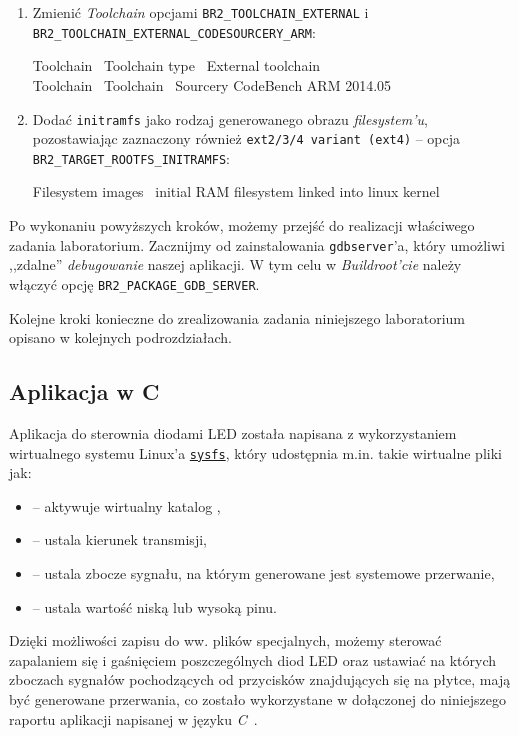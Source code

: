 \documentclass{article}
\newenvironment{ttblock}{\ttfamily}{\par}
\begin{document}
\begin{enumerate}
\item Zmienić \emph{Toolchain} opcjami \texttt{BR2\_TOOLCHAIN\_EXTERNAL} i\\ \texttt{BR2\_TOOLCHAIN\_EXTERNAL\_CODESOURCERY\_ARM}:

\begin{ttblock}
Toolchain \textrightarrow\ Toolchain type \textrightarrow\ External toolchain\\
Toolchain \textrightarrow\ Toolchain \textrightarrow\ Sourcery CodeBench ARM 2014.05
\end{ttblock}

\item Dodać \texttt{initramfs} jako rodzaj generowanego obrazu \emph{filesystem'u}, pozostawiając zaznaczony również \texttt{ext2/3/4 variant (ext4)} -- opcja \\\texttt{BR2\_TARGET\_ROOTFS\_INITRAMFS}:

\begin{ttblock}
Filesystem images \textrightarrow\ initial RAM filesystem linked into linux kernel
\end{ttblock}
\end{enumerate}

Po wykonaniu powyższych kroków, możemy przejść do realizacji właściwego zadania laboratorium. Zacznijmy od zainstalowania \texttt{gdbserver}'a, który umożliwi ,,zdalne'' \emph{debugowanie} naszej aplikacji. W tym celu w \emph{Buildroot'cie} należy włączyć opcję \texttt{BR2\_PACKAGE\_GDB\_SERVER}.

Kolejne kroki konieczne do zrealizowania zadania niniejszego laboratorium opisano w kolejnych podrozdziałach.


\subsection{Aplikacja w C}

Aplikacja do sterownia diodami LED została napisana z wykorzystaniem wirtualnego systemu Linux'a \href{https://www.kernel.org/doc/Documentation/filesystems/sysfs.txt}{\texttt{sysfs}}, który udostępnia m.in. takie wirtualne pliki jak:
\begin{itemize}
\item {} -- aktywuje wirtualny katalog ,
\item {} -- ustala kierunek transmisji,
\item {} -- ustala zbocze sygnału, na którym generowane jest systemowe przerwanie,
\item {} -- ustala wartość niską lub wysoką pinu.
\end{itemize}
Dzięki możliwości zapisu do ww. plików specjalnych, możemy sterować zapalaniem się i gaśnięciem poszczególnych diod LED oraz ustawiać na których zboczach sygnałów pochodzących od przycisków znajdujących się na płytce, mają być generowane przerwania, co zostało wykorzystane w dołączonej do niniejszego raportu aplikacji napisanej w języku \emph{C}~\cite{www:elinux_gpio,www:gpio_benchmark}.
\end{document}
